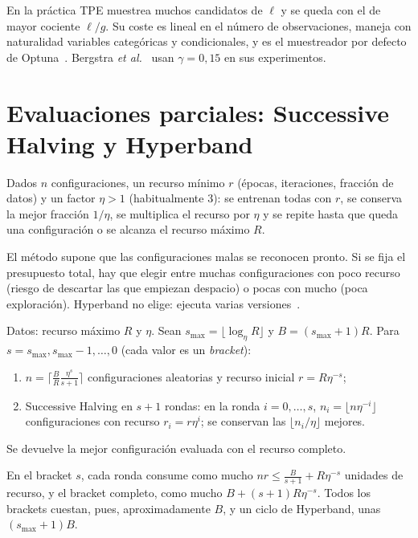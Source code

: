 En la práctica TPE muestrea muchos candidatos de $\ell$ y se queda con el de mayor cociente $\ell/g$. Su coste es lineal en el número de observaciones, maneja con naturalidad variables categóricas y condicionales, y es el muestreador por defecto de Optuna~\cite{optuna}. Bergstra \emph{et al.}~\cite[§6]{tpe} usan $\gamma=0{,}15$ en sus experimentos.

\section{Evaluaciones parciales: Successive Halving y Hyperband}
\label{sec:hyperband}

\begin{definicion}\label{def:sh}
Dados $n$ configuraciones, un recurso mínimo $r$ (épocas, iteraciones, fracción de datos) y un factor $\eta>1$ (habitualmente 3): se entrenan todas con $r$, se conserva la mejor fracción $1/\eta$, se multiplica el recurso por $\eta$ y se repite hasta que queda una configuración o se alcanza el recurso máximo $R$.
\end{definicion}

El método supone que las configuraciones malas se reconocen pronto. Si se fija el presupuesto total, hay que elegir entre muchas configuraciones con poco recurso (riesgo de descartar las que empiezan despacio) o pocas con mucho (poca exploración). Hyperband no elige: ejecuta varias versiones~\cite[§3.2]{hyperband}.

\begin{algoritmo}[Hyperband]\label{alg:hyperband}
Datos: recurso máximo $R$ y $\eta$. Sean $s_{\max}=\lfloor\log_\eta R\rfloor$ y $B=(s_{\max}+1)R$. Para $s=s_{\max},s_{\max}-1,\dots,0$ (cada valor es un \emph{bracket}):
\begin{enumerate}[label=\arabic*.]
  \item $n=\bigl\lceil\frac{B}{R}\frac{\eta^{s}}{s+1}\bigr\rceil$ configuraciones aleatorias y recurso inicial $r=R\eta^{-s}$;
  \item Successive Halving en $s+1$ rondas: en la ronda $i=0,\dots,s$, $n_i=\lfloor n\eta^{-i}\rfloor$ configuraciones con recurso $r_i=r\eta^{i}$; se conservan las $\lfloor n_i/\eta\rfloor$ mejores.
\end{enumerate}
Se devuelve la mejor configuración evaluada con el recurso completo.
\end{algoritmo}

\begin{proposicion}\label{prop:bracket}
En el bracket $s$, cada ronda consume como mucho $nr\le\frac{B}{s+1}+R\eta^{-s}$ unidades de recurso, y el bracket completo, como mucho $B+(s+1)R\eta^{-s}$. Todos los brackets cuestan, pues, aproximadamente $B$, y un ciclo de Hyperband, unas $(s_{\max}+1)B$.
\end{proposicion}

